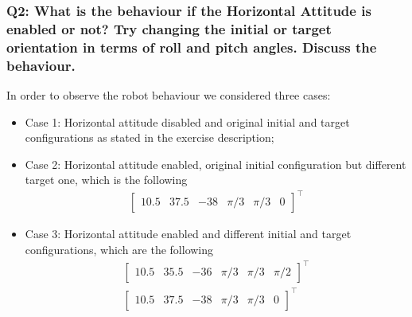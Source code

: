 \documentclass{article}
\begin{document}
\subsubsection{Q2: What is the behaviour if the Horizontal Attitude is enabled or not? Try changing the initial or target orientation in terms of roll and pitch angles. Discuss the behaviour.}
In order to observe the robot behaviour we considered three cases:
\begin{itemize}
	\item Case 1: Horizontal attitude disabled and original initial and target configurations as stated in the exercise description;
	\item Case 2: Horizontal attitude enabled, original initial configuration but different target one, which is the following 
	\begin{gather*}
		\begin{bmatrix} 10.5 & 37.5 & -38 & \pi/3 & \pi/3 & 0\end{bmatrix}^\top
	\end{gather*}
	\item Case 3: Horizontal attitude enabled and different initial and target configurations, which are the following 
	\begin{gather*}
		\begin{bmatrix} 10.5 & 35.5 & -36 & \pi/3 & \pi/3 & \pi/2\end{bmatrix}^\top \\
		\begin{bmatrix} 10.5 & 37.5 & -38 & \pi/3 & \pi/3 & 0\end{bmatrix}^\top
	\end{gather*}
\end{itemize}
\end{document}
